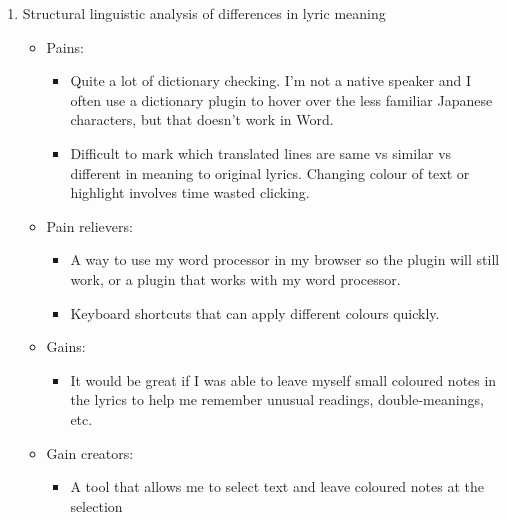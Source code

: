 \documentclass[12pt]{article}
\begin{document}
\begin{enumerate}
    \item Structural linguistic analysis of differences in lyric meaning
    \begin{itemize}
        \renewcommand{\labelitemi}{$\clock$}
        \renewcommand{\labelitemii}{$\cdot$}
        \item Pains:
        \begin{itemize}
            \item Quite a lot of dictionary checking. I'm not a native speaker and I often use a dictionary plugin to hover over the less familiar Japanese characters, but that doesn't work in Word.
            \item Difficult to mark which translated lines are same vs similar vs different in meaning to original lyrics. Changing colour of text or highlight involves time wasted clicking.
        \end{itemize}
        \renewcommand{\labelitemi}{$\sun$}
        \item Pain relievers:
        \begin{itemize}
            \item A way to use my word processor in my browser so the plugin will still work, or a plugin that works with my word processor.
            \item Keyboard shortcuts that can apply different colours quickly.
        \end{itemize}
        \renewcommand{\labelitemi}{$\smiley$}    
        \item Gains:
        \begin{itemize}
            \item It would be great if I was able to leave myself small coloured notes in the lyrics to help me remember unusual readings, double-meanings, etc.
        \end{itemize}
        \renewcommand{\labelitemi}{$\blacksmiley$}
        \item Gain creators:
        \begin{itemize}
            \item A tool that allows me to select text and leave coloured notes at the selection
        \end{itemize}
    \end{itemize}
    

\end{enumerate}
\end{document}
